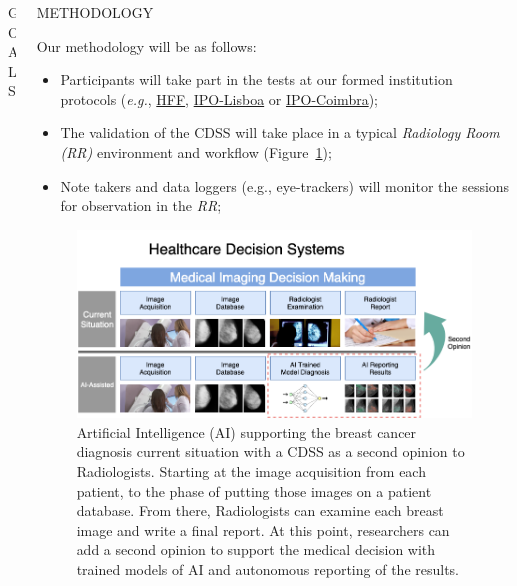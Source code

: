 \documentclass[final]{beamer}
\begin{document}
\begin{frame}[t, fragile = singleslide]{}
\begin{columns}[t]
\begin{column}{0.45\textwidth}
\begin{block}{GOALS}
\vspace{10mm}

\end{block}

\end{column}

\begin{column}{0.45\textwidth}

\begin{block}{METHODOLOGY}

Our methodology will be as follows:

\begin{itemize}
\item Participants will take part in the tests at our formed institution protocols (\textit{e.g.}, \hyperlink{http://hff.min-saude.pt/}{HFF}, \hyperlink{http://www.ipolisboa.min-saude.pt/}{IPO-Lisboa} or \hyperlink{https://ipocoimbra.com/}{IPO-Coimbra});
\item The validation of the CDSS will take place in a typical \textit{Radiology Room (RR)} environment and workflow (Figure~\ref{fig:fig001});
\item  Note takers and data loggers ({e.g.}, eye-trackers) will monitor the sessions for observation in the \textit{RR};
\end{itemize}

\begin{figure}[!htb]
\centering
\caption{Artificial Intelligence (AI) supporting the breast cancer diagnosis current situation with a CDSS as a second opinion to Radiologists. Starting at the image acquisition from each patient, to the phase of putting those images on a patient database. From there, Radiologists can examine each breast image and write a final report. At this point, researchers can add a second opinion to support the medical decision with trained models of AI and autonomous reporting of the results.}
\label{fig:fig001}
\includegraphics[width = \columnwidth]{./figures/fig001}
\end{figure}


\end{block}
\end{column}
\end{columns}
\end{frame}
\end{document}
